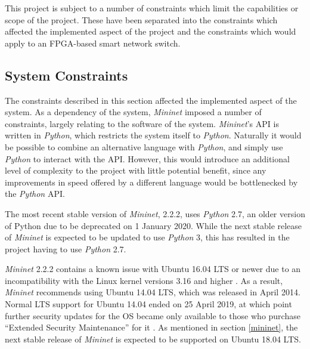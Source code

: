 
This project is subject to a number of constraints which limit the capabilities or scope of the project.
These have been separated into the constraints which affected the implemented aspect of the project and the constraints which would apply to an FPGA-based smart network switch.

\subsection{System Constraints}
The constraints described in this section affected the implemented aspect of the system. As a dependency of the system, \textit{Mininet} \cite{mininet} imposed a number of constraints, largely relating to the software of the system. \textit{Mininet}'s API is written in \textit{Python}, which restricts the system itself to \textit{Python}. Naturally it would be possible to combine an alternative language with \textit{Python}, and simply use \textit{Python} to interact with the API. However, this would introduce an additional level of complexity to the project with little potential benefit, since any improvements in speed offered by a different language would be bottlenecked by the \textit{Python} API.

The most recent stable version of \textit{Mininet}, 2.2.2, uses \textit{Python} 2.7, an older version of Python due to be deprecated on 1 January 2020. While the next stable release of \textit{Mininet} is expected to be updated to use \textit{Python} 3, this has resulted in the project having to use \textit{Python} 2.7.

\textit{Mininet} 2.2.2 contains a known issue with Ubuntu 16.04 LTS or newer due to an incompatibility with the Linux kernel versions 3.16 and higher \cite{mininet_2_2_2_release_notes}. As a result, \textit{Mininet} recommends using Ubuntu 14.04 LTS, which was released in April 2014. Normal LTS support for Ubuntu 14.04 ended on 25 April 2019, at which point further security updates for the OS became only available to those who purchase ``Extended Security Maintenance'' for it \cite{ubuntu_14_04_release}. As mentioned in section \ref{mininet}, the next stable release of \textit{Mininet} is expected to be supported on Ubuntu 18.04 LTS.

